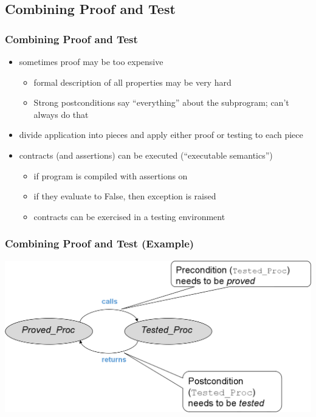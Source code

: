 \subsection{Combining Proof and Test}
\begin{frame}
  \frametitle{Combining Proof and Test}  
  \begin{itemize}
  \item sometimes proof may be too expensive
    \begin{itemize}
    \item formal description of all properties may be very hard
    \item Strong postconditions say ``everything'' about the
      subprogram; can't always do that
    \end{itemize}
  \item divide application into pieces and apply either proof or testing to each piece
  \item contracts (and assertions) can be executed (``executable semantics'')
    \begin{itemize}
    \item if program is compiled with assertions on
    \item if they evaluate to False, then exception is raised
    \item contracts can be exercised in a testing environment
    \end{itemize}
  \end{itemize}
\end{frame}
\addtocounter{clock}{3}

\begin{frame}
  \frametitle{Combining Proof and Test (Example)}
  \includegraphics[width=1.\textwidth]{content/images/spark/combining}
\end{frame}
\addtocounter{clock}{1}


